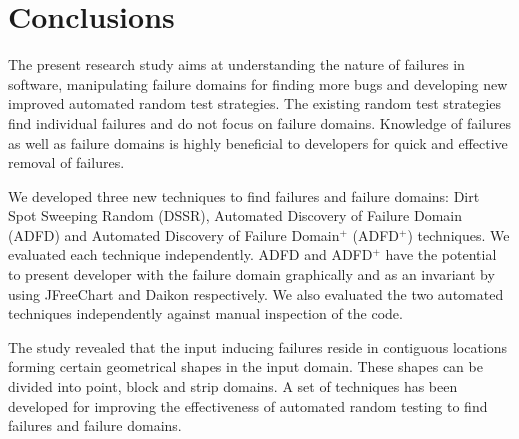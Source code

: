 
\chapter{Conclusions}
\label{chap:conclusions_8}



The present research study aims at understanding the nature of failures in software, manipulating failure domains for finding more bugs and developing new improved automated random test strategies. The existing random test strategies find individual failures and do not focus on failure domains. Knowledge of failures as well as failure domains is highly beneficial to developers for quick and effective removal of failures.


We developed three new techniques to find failures and failure domains: Dirt Spot Sweeping Random (DSSR), Automated Discovery of Failure Domain (ADFD) and Automated Discovery of Failure Domain$^+$ (ADFD$^+$) techniques. We evaluated each technique independently. ADFD and ADFD$^+$ have the potential to present developer with the failure domain graphically and as an invariant by using JFreeChart and Daikon respectively. We also evaluated the two automated techniques independently against manual inspection of the code.

 
The study revealed that the input inducing failures reside in contiguous locations forming certain geometrical shapes in the input domain. These shapes can be divided into point, block and strip domains. A set of techniques has been developed for improving the effectiveness of automated random testing to find failures and failure domains. 


